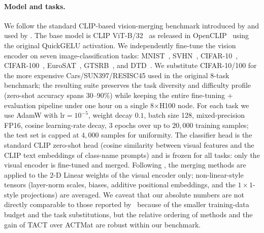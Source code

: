 \documentclass{article}
\theoremstyle{plain}
\theoremstyle{definition}
\theoremstyle{remark}
\begin{document}
\paragraph{Model and tasks.}
We follow the standard CLIP-based vision-merging benchmark introduced by \citet{ilharco2023editing} and used by \citet{yadav2023ties, hameed2026actmat}. The base model is CLIP ViT-B/32~\citep{radford2021learning} as released in OpenCLIP~\citep{ilharco_openclip} using the original QuickGELU activation. We independently fine-tune the vision encoder on seven image-classification tasks: MNIST~\citep{lecun1998mnist}, SVHN~\citep{netzer2011svhn}, CIFAR-10~\citep{krizhevsky2009learning}, CIFAR-100~\citep{krizhevsky2009learning}, EuroSAT~\citep{helber2019eurosat}, GTSRB~\citep{stallkamp2011gtsrb}, and DTD~\citep{cimpoi2014dtd}. We substitute CIFAR-10/100 for the more expensive Cars/SUN397/RESISC45 used in the original 8-task benchmark; the resulting suite preserves the task diversity and difficulty profile (zero-shot accuracy spans 30--90\%) while keeping the entire fine-tuning + evaluation pipeline under one hour on a single 8$\times$H100 node. For each task we use AdamW with $\mathrm{lr}=10^{-5}$, weight decay $0.1$, batch size 128, mixed-precision FP16, cosine learning-rate decay, 3 epochs over up to $20{,}000$ training samples; the test set is capped at $4{,}000$ samples for uniformity. The classifier head is the standard CLIP zero-shot head (cosine similarity between visual features and the CLIP text embeddings of class-name prompts) and is frozen for all tasks: only the visual encoder is fine-tuned and merged. Following \citet{yadav2023ties, hameed2026actmat}, the merging methods are applied to the $2$-D Linear weights of the visual encoder only; non-linear-style tensors (layer-norm scales, biases, additive positional embeddings, and the $1\times1$-style projections) are averaged. We caveat that our absolute numbers are not directly comparable to those reported by~\citet{hameed2026actmat} because of the smaller training-data budget and the task substitutions, but the relative ordering of methods and the gain of TACT over ACTMat are robust within our benchmark.
\end{document}
